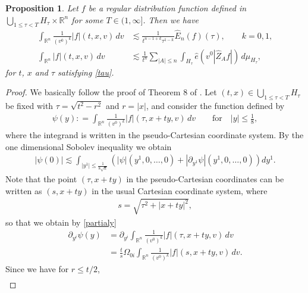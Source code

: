 \documentclass{article}
\newtheorem{proposition}{Proposition}[section]
\newcommand{\bbr}{{\mathbb R}}
\newcommand{\bbrn}{{\bbr^n}}
\begin{document}
%
\begin{proposition} \label{prop KSf}
Let $ f $ be a regular distribution function defined in $ \bigcup_{ 1 \leq \tau < T } H_\tau \times \bbrn $ for some $ T \in ( 1 , \infty ] $. Then we have
\begin{align}
\int_\bbrn \frac{ 1 }{ ( v^0 )^k } | f | ( t , x , v ) \, d v & \lesssim \frac{ 1 }{ t^{ n - 1 + k } \tau^{ 1 - k } } \hat{ E }_n ( f ) ( \tau ) , \qquad k = 0 , 1 , \label{KSf} \\
\int_\bbrn | f | ( t , x , v ) \, d v & \lesssim \frac{ 1 }{ t^n } \sum_{ | A | \leq n } \int_{ H_\tau } \hat{ e } ( v^0 | \hat{ Z }_A f | ) \, d \mu_{ H_\tau } , \label{KSfimprove}
\end{align}
for $ t $, $ x $ and $ \tau $ satisfying \eqref{tau}.
\end{proposition}
\begin{proof}
We basically follow the proof of Theorem 8 of \cite{FJS17}. Let $ ( t , x ) \in \bigcup_{ 1 \leq \tau < T } H_\tau $ be fixed with $ \tau = \sqrt{ t^2 - r^2 } $ and $ r = | x | $, and consider the function defined by
\begin{align*}
\psi ( y ) : = \int_{ \bbr^n } \frac{ 1 }{ ( v^0 )^k } | f | ( \tau , x + t y , v ) \, d v \qquad \mbox{for} \quad | y | \leq \frac18 ,
\end{align*}
where the integrand is written in the pseudo-Cartesian coordinate system. By the one dimensional Sobolev inequality we obtain
\begin{align*}
| \psi ( 0 ) | \lesssim \int_{ | y^1 | \leq \frac{ 1 }{ 8 \sqrt{ n } } } \left( | \psi | ( y^1 , 0 , \dots , 0 ) + | \partial_{ y^1 } \psi | ( y^1 , 0 , \dots , 0 ) \right) d y^1 .
\end{align*}
Note that the point $ ( \tau , x + t y ) $ in the pseudo-Cartesian coordinates can be written as $ ( s , x + t y ) $ in the usual Cartesian coordinate system, where
\begin{align*}
s = \sqrt{ \tau^2 + | x + t y |^2 } ,
\end{align*}
so that we obtain by \eqref{partialy}
\begin{align*}
\partial_{ y^i } \psi ( y ) & = \partial_{ y^i } \int_\bbrn \frac{ 1 }{ ( v^0 )^k } | f | ( \tau , x + t y , v ) \, d v \\
& = \frac{ t }{ s } \Omega_{ 0 i } \int_\bbrn \frac{ 1 }{ ( v^0 )^k } | f | ( s , x + t y , v ) \, d v .
\end{align*}
Since we have for $ r \leq t / 2 $,
\begin{align}

\end{align}
\end{proof}
\end{document}
